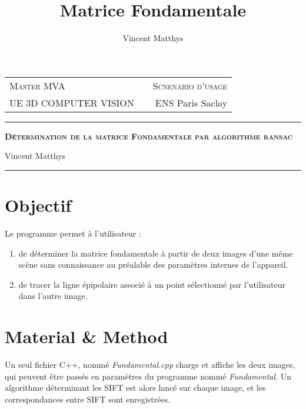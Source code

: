 \documentclass[12pt,a4paper,onecolumn]{article}
\title{Matrice Fondamentale}
\author{Vincent Matthys}
\begin{document}
\begin{tabularx}{\textwidth}{@{} l X r @{} }
	{\textsc{Master MVA}}          &  & \textsc{Scnenario d'usage} \\
	\textsc{UE 3D COMPUTER VISION} &  & {ENS Paris Saclay}         \\
\end{tabularx}
\vspace{1.5cm}
\begin{center}

	\rule[11pt]{5cm}{0.5pt}

	\textbf{\LARGE \textsc{Détermination de la matrice Fondamentale par algorithme ransac}}
	\vspace{0.5cm}

	Vincent Matthys


	\rule{5cm}{0.5pt}

	\vspace{1.5cm}
\end{center}

\section{Objectif}
Le programme permet à l'utilisateur :
\begin{enumerate}
	\item de déterminer la matrice fondamentale à partir de deux images d'une même scène sans connaissance au préalable des paramètres internes de l'appareil.
	\item de tracer la ligne épipolaire associé à un point sélectionné par l'utilisateur dans l'autre image.
\end{enumerate}


\section{Material \& Method}
Un seul fichier C++, nommé \textit{Fundamental.cpp} charge et affiche les deux images, qui peuvent être passés en paramètres du programme nommé \textit{Fundamental}. Un algorithme déterminant les SIFT est alors lancé sur chaque image, et les correspondances entre SIFT sont enregistrées.
\end{document}
